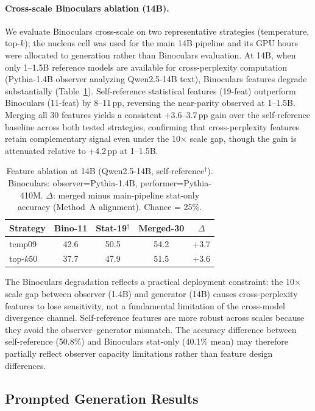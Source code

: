 \paragraph{Cross-scale Binoculars ablation (14B).}
We evaluate Binoculars cross-scale on two representative strategies (temperature, top-$k$); the nucleus cell was used for the main 14B pipeline and its GPU hours were allocated to generation rather than Binoculars evaluation.
At 14B, when only 1--1.5B reference models are available for cross-perplexity computation (Pythia-1.4B observer analyzing Qwen2.5-14B text), Binoculars features degrade substantially (Table~\ref{tab:bino_14b_ablation}).
Self-reference statistical features (19-feat) outperform Binoculars (11-feat) by 8--11\,pp, reversing the near-parity observed at 1--1.5B.
Merging all 30 features yields a consistent +3.6--3.7\,pp gain over the self-reference baseline across both tested strategies, confirming that cross-perplexity features retain complementary signal even under the 10$\times$ scale gap, though the gain is attenuated relative to +4.2\,pp at 1--1.5B.

\begin{table}[h]
\centering
\small
\caption{Feature ablation at 14B (Qwen2.5-14B, self-reference$^\dagger$). Binoculars: observer=Pythia-1.4B, performer=Pythia-410M. $\Delta$: merged minus main-pipeline stat-only accuracy (Method~A alignment). Chance = 25\%.}
\label{tab:bino_14b_ablation}
\begin{tabular}{@{}lcccc@{}}
\toprule
Strategy & Bino-11 & Stat-19$^\dagger$ & Merged-30 & $\Delta$ \\
\midrule
temp09 & 42.6 & 50.5 & 54.2 & +3.7 \\
top-$k$50 & 37.7 & 47.9 & 51.5 & +3.6 \\
\bottomrule
\end{tabular}
\end{table}

The Binoculars degradation reflects a practical deployment constraint: the 10$\times$ scale gap between observer (1.4B) and generator (14B) causes cross-perplexity features to lose sensitivity, not a fundamental limitation of the cross-model divergence channel.
Self-reference features are more robust across scales because they avoid the observer--generator mismatch.
The accuracy difference between self-reference (50.8\%) and Binoculars stat-only (40.1\% mean) may therefore partially reflect observer capacity limitations rather than feature design differences.

\subsection{Prompted Generation Results}
\label{app:prompted_gen}

